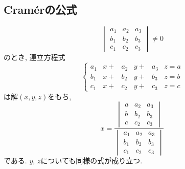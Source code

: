 \subsection{Cram\'erの公式}
\begin{bthm}
\[\begin{vmatrix}a_1&a_2&a_3\\b_1&b_2&b_3\\c_1&c_2&c_3\end{vmatrix}\neq 0\]
のとき, 連立方程式
\[\left\{\begin{alignedat}{3}
a_1&x+{}&a_2&y+{}&a_3&z=a\\
b_1&x+{}&b_2&y+{}&b_3&z=b\\
c_1&x+{}&c_2&y+{}&c_3&z=c
\end{alignedat}\right.\]
は解$(x,y,z)$をもち,
\[x=\frac{\begin{vmatrix}a&a_2&a_3\\b&b_2&b_3\\c&c_2&c_3\end{vmatrix}}{\begin{vmatrix}a_1&a_2&a_3\\b_1&b_2&b_3\\c_1&c_2&c_3\end{vmatrix}}\]
である.
$y$, $z$についても同様の式が成り立つ.
\end{bthm}
